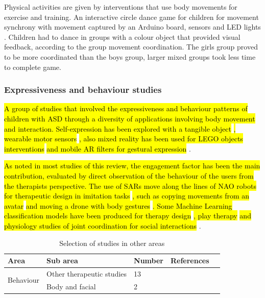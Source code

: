\documentclass[a4paper,fleqn]{cas-sc}
\begin{document}
Physical activities are given by interventions that use body movements for exercise and training.
An interactive circle dance game for children for movement synchrony with movement captured by an Arduino board, sensors and LED lights \cite{Baharin19}. Children had to dance in groups with a colour object that provided visual feedback, according to the group movement coordination. The girls group proved to be more coordinated than the boys group, larger mixed groups took less time to complete game.

\subsubsection{Expressiveness and behaviour studies}
\label{sec:app-expression}
\hl{A group of studies that involved the expressiveness and behaviour patterns of children with ASD through a diversity of applications involving body movement and interaction. Self-expression has been explored with a tangible object} \cite{Wilson20}\hl{, wearable motor sensors} \cite{Giomi18}\hl{, also mixed reality has been used for LEGO objects interventions} \cite{Sayis21} \hl{and mobile AR filters for gestural expression} \cite{Pohl20}.

\hl{As noted in most studies of this review, the engagement factor has been the main contribution, evaluated by direct observation of the behaviour of the users from the therapists perspective. The use of SARs move along the lines of NAO robots for therapeutic design in imitation tasks} \cite{Chevalier17, Geminiani19}\hl{, such as copying movements from an avatar} \cite{Santos20, Santos21} \hl{and moving a drone with body gestures} \cite{Ascensao22}\hl{. Some Machine Learning classification models have been produced for therapy design} \cite{Zampella21}\hl{, play therapy} \cite{Li21} \hl{and physiology studies of joint coordination for social interactions} \cite{Whyatt17}.

\begin{table}[h]
\centering
\begin{center}
\begin{tabular*}{6.2in}{p{0.85in}|p{0.82in}|p{0.35in}|p{3.5in}p{0in}}
\hline
Area   & Sub area   & Number & References  &  \\ \hline
\multirow{2}{*}{Behaviour}   
    & Other therapeutic studies  & 13 & \cite{Ascensao22,Li22,Li21,Santos21,
    Sayis21,Zampella21,Rosly20,Wilson20,Javed19,Geminiani19,Sorce18, Chevalier17,Whyatt17} &  \\ \cline{1-4}
\multirow{1}{*}{\centering Expression} 
    & Body and facial     & 2     & \cite{Pohl20, Giomi18}  & 
    \\ \cline{1-4}
\end{tabular*}
\caption{Selection of studies in other areas}
\label{TABLE:area-other}
\end{center}
\end{table}
\end{document}
